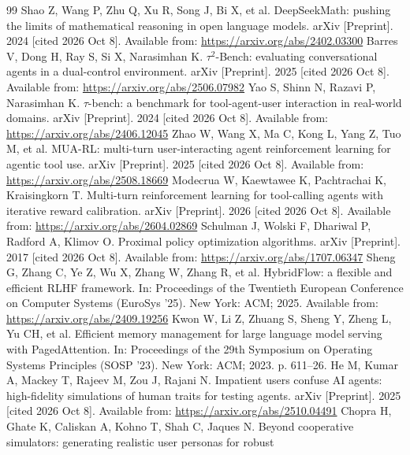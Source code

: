 \documentclass[12pt,a4paper]{article}
\begin{document}
\renewcommand{\refname}{References}
\begin{thebibliography}{99}
\small
\setlength{\itemsep}{1pt}
 Shao Z, Wang P, Zhu Q, Xu R, Song J, Bi X, et al.
DeepSeekMath: pushing the limits of mathematical reasoning in open language
models. arXiv [Preprint]. 2024 [cited 2026 Oct 8]. Available from:
\url{https://arxiv.org/abs/2402.03300}
 Barres V, Dong H, Ray S, Si X, Narasimhan K.
$\tau^2$-Bench: evaluating conversational agents in a dual-control
environment. arXiv [Preprint]. 2025 [cited 2026 Oct 8]. Available from:
\url{https://arxiv.org/abs/2506.07982}
 Yao S, Shinn N, Razavi P, Narasimhan K. $\tau$-bench: a
benchmark for tool-agent-user interaction in real-world domains. arXiv
[Preprint]. 2024 [cited 2026 Oct 8]. Available from:
\url{https://arxiv.org/abs/2406.12045}
 Zhao W, Wang X, Ma C, Kong L, Yang Z, Tuo M, et al.
MUA-RL: multi-turn user-interacting agent reinforcement learning for agentic
tool use. arXiv [Preprint]. 2025 [cited 2026 Oct 8]. Available from:
\url{https://arxiv.org/abs/2508.18669}
 Modecrua W, Kaewtawee K, Pachtrachai K, Kraisingkorn T.
Multi-turn reinforcement learning for tool-calling agents with iterative
reward calibration. arXiv [Preprint]. 2026 [cited 2026 Oct 8]. Available
from: \url{https://arxiv.org/abs/2604.02869}
 Schulman J, Wolski F, Dhariwal P, Radford A, Klimov O.
Proximal policy optimization algorithms. arXiv [Preprint]. 2017 [cited 2026
Oct 8]. Available from: \url{https://arxiv.org/abs/1707.06347}
 Sheng G, Zhang C, Ye Z, Wu X, Zhang W, Zhang R, et al.
HybridFlow: a flexible and efficient RLHF framework. In: Proceedings of the
Twentieth European Conference on Computer Systems (EuroSys '25). New York:
ACM; 2025. Available from: \url{https://arxiv.org/abs/2409.19256}
 Kwon W, Li Z, Zhuang S, Sheng Y, Zheng L, Yu CH, et al.
Efficient memory management for large language model serving with
PagedAttention. In: Proceedings of the 29th Symposium on Operating Systems
Principles (SOSP '23). New York: ACM; 2023. p. 611--26.
 He M, Kumar A, Mackey T, Rajeev M, Zou J, Rajani N.
Impatient users confuse AI agents: high-fidelity simulations of human traits
for testing agents. arXiv [Preprint]. 2025 [cited 2026 Oct 8]. Available
from: \url{https://arxiv.org/abs/2510.04491}
 Chopra H, Ghate K, Caliskan A, Kohno T, Shah C, Jaques N.
Beyond cooperative simulators: generating realistic user personas for robust

\end{thebibliography}
\end{document}
